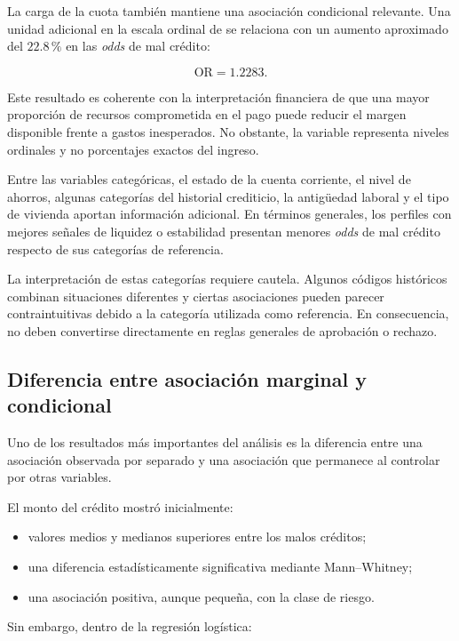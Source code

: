 La carga de la cuota también mantiene una asociación condicional
relevante. Una unidad adicional en la escala ordinal de
 se relaciona con un aumento aproximado del
\(22.8\,\%\) en las \textit{odds} de mal crédito:

\[
\mathrm{OR}=1.2283.
\]

Este resultado es coherente con la interpretación financiera de que una
mayor proporción de recursos comprometida en el pago puede reducir el
margen disponible frente a gastos inesperados. No obstante, la variable
representa niveles ordinales y no porcentajes exactos del ingreso.

Entre las variables categóricas, el estado de la cuenta corriente, el
nivel de ahorros, algunas categorías del historial crediticio, la
antigüedad laboral y el tipo de vivienda aportan información adicional.
En términos generales, los perfiles con mejores señales de liquidez o
estabilidad presentan menores \textit{odds} de mal crédito respecto de
sus categorías de referencia.

La interpretación de estas categorías requiere cautela. Algunos códigos
históricos combinan situaciones diferentes y ciertas asociaciones pueden
parecer contraintuitivas debido a la categoría utilizada como referencia.
En consecuencia, no deben convertirse directamente en reglas generales
de aprobación o rechazo.

\subsection{Diferencia entre asociación marginal y condicional}

Uno de los resultados más importantes del análisis es la diferencia entre
una asociación observada por separado y una asociación que permanece al
controlar por otras variables.

El monto del crédito mostró inicialmente:

\begin{itemize}
    \item valores medios y medianos superiores entre los malos créditos;

    \item una diferencia estadísticamente significativa mediante
    Mann--Whitney;

    \item una asociación positiva, aunque pequeña, con la clase de
    riesgo.
\end{itemize}

Sin embargo, dentro de la regresión logística:

